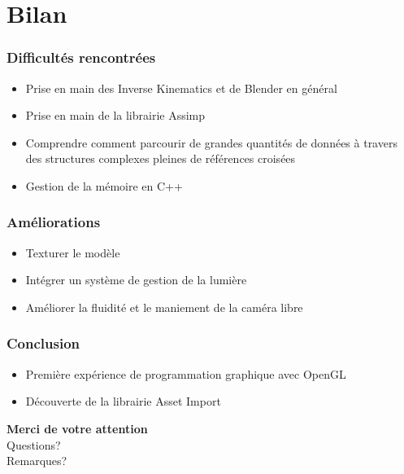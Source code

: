 \documentclass[10pt]{beamer}
\begin{document}
\section{Bilan}
\begin{frame}
\frametitle{Difficultés rencontrées}
\begin{itemize}
	\item Prise en main des Inverse Kinematics et de Blender en général
	\item Prise en main de la librairie Assimp
	\item Comprendre comment parcourir de grandes quantités de données à travers des structures complexes pleines de références croisées
	\item Gestion de la mémoire en C++
\end{itemize}
\end{frame}

\begin{frame}
\frametitle{Améliorations}
\begin{itemize}
	\item Texturer le modèle
	\item Intégrer un système de gestion de la lumière
	\item Améliorer la fluidité et le maniement de la caméra libre
\end{itemize}
\end{frame}

\begin{frame}
\frametitle{Conclusion}
\begin{itemize}
	\item Première expérience de programmation graphique avec OpenGL
	\item Découverte de la librairie Asset Import
\end{itemize}
\end{frame}

\begin{frame}
\begin{center}
\textbf{Merci de votre attention}\\
    Questions?\\
    Remarques?\\
\end{center}
\end{frame}
\end{document}
